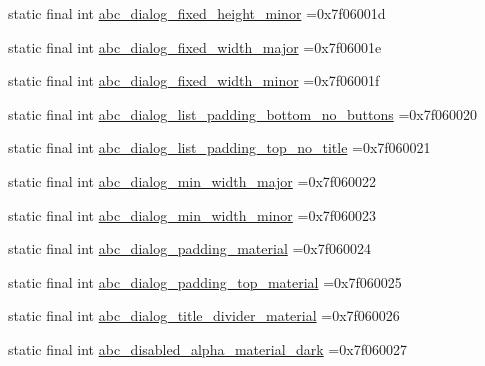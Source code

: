 \begin{DoxyCompactItemize}
\item 
static final int \mbox{\hyperlink{classcom_1_1example_1_1trainawearapplication_1_1_r_1_1dimen_ada3364a7057954dc8462d807f74ead56}{abc\+\_\+dialog\+\_\+fixed\+\_\+height\+\_\+minor}} =0x7f06001d
\item 
static final int \mbox{\hyperlink{classcom_1_1example_1_1trainawearapplication_1_1_r_1_1dimen_a3e3b74a548c243e2638dad59f824a65c}{abc\+\_\+dialog\+\_\+fixed\+\_\+width\+\_\+major}} =0x7f06001e
\item 
static final int \mbox{\hyperlink{classcom_1_1example_1_1trainawearapplication_1_1_r_1_1dimen_a71a01eb96289b80dac419c025c1f3aa1}{abc\+\_\+dialog\+\_\+fixed\+\_\+width\+\_\+minor}} =0x7f06001f
\item 
static final int \mbox{\hyperlink{classcom_1_1example_1_1trainawearapplication_1_1_r_1_1dimen_a3a021530ff371c8f2464a47193034a23}{abc\+\_\+dialog\+\_\+list\+\_\+padding\+\_\+bottom\+\_\+no\+\_\+buttons}} =0x7f060020
\item 
static final int \mbox{\hyperlink{classcom_1_1example_1_1trainawearapplication_1_1_r_1_1dimen_a0d736b226b1f075ef7a7cfe970657f8e}{abc\+\_\+dialog\+\_\+list\+\_\+padding\+\_\+top\+\_\+no\+\_\+title}} =0x7f060021
\item 
static final int \mbox{\hyperlink{classcom_1_1example_1_1trainawearapplication_1_1_r_1_1dimen_a451b79dae8052377f73f4f3162aa73b4}{abc\+\_\+dialog\+\_\+min\+\_\+width\+\_\+major}} =0x7f060022
\item 
static final int \mbox{\hyperlink{classcom_1_1example_1_1trainawearapplication_1_1_r_1_1dimen_adffdcba589d9ea29a43dfa5e8bed8bc0}{abc\+\_\+dialog\+\_\+min\+\_\+width\+\_\+minor}} =0x7f060023
\item 
static final int \mbox{\hyperlink{classcom_1_1example_1_1trainawearapplication_1_1_r_1_1dimen_aaa063f3283ab1bdf9437bbb13b437276}{abc\+\_\+dialog\+\_\+padding\+\_\+material}} =0x7f060024
\item 
static final int \mbox{\hyperlink{classcom_1_1example_1_1trainawearapplication_1_1_r_1_1dimen_af1fbd4d4c9a4f3f92fd0cdf07f91e2d3}{abc\+\_\+dialog\+\_\+padding\+\_\+top\+\_\+material}} =0x7f060025
\item 
static final int \mbox{\hyperlink{classcom_1_1example_1_1trainawearapplication_1_1_r_1_1dimen_a58fd186ea220ffbd95ca039af9f856ca}{abc\+\_\+dialog\+\_\+title\+\_\+divider\+\_\+material}} =0x7f060026
\item 
static final int \mbox{\hyperlink{classcom_1_1example_1_1trainawearapplication_1_1_r_1_1dimen_a9172f120f0c79fa517a14a2dbdf07cdb}{abc\+\_\+disabled\+\_\+alpha\+\_\+material\+\_\+dark}} =0x7f060027

\end{DoxyCompactItemize}
